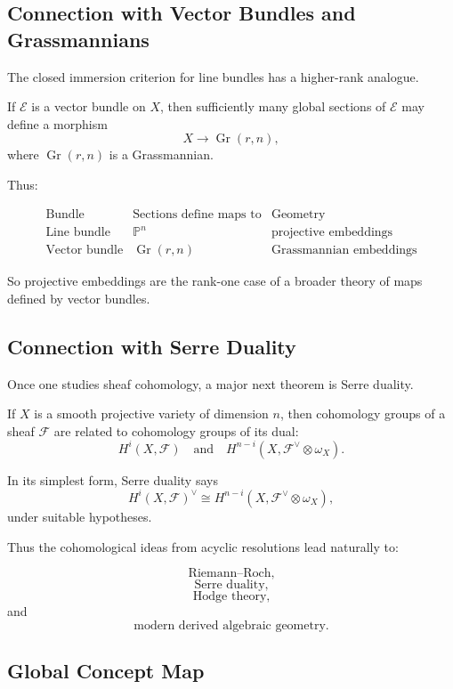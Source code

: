 \documentclass[12pt,a4paper]{article}
\theoremstyle{notespace}
\begin{document}
\subsection{Connection with Vector Bundles and Grassmannians}

The closed immersion criterion for line bundles has a higher-rank analogue.

If \(\mathcal E\) is a vector bundle on \(X\), then sufficiently many global sections of \(\mathcal E\) may define a morphism
\[
X\to \operatorname{Gr}(r,n),
\]
where \(\operatorname{Gr}(r,n)\) is a Grassmannian.

Thus:

\[
\begin{array}{c|c|c}
	\text{Bundle} & \text{Sections define maps to} & \text{Geometry} \\
	\hline
	\text{Line bundle} & \mathbb P^n & \text{projective embeddings} \\
	\text{Vector bundle} & \operatorname{Gr}(r,n) & \text{Grassmannian embeddings}
\end{array}
\]

So projective embeddings are the rank-one case of a broader theory of maps defined by vector bundles.

\subsection{Connection with Serre Duality}

Once one studies sheaf cohomology, a major next theorem is Serre duality.

If \(X\) is a smooth projective variety of dimension \(n\), then cohomology groups of a sheaf \(\mathcal F\) are related to cohomology groups of its dual:
\[
H^i(X,\mathcal F)
\quad\text{and}\quad
H^{n-i}(X,\mathcal F^\vee\otimes \omega_X).
\]

In its simplest form, Serre duality says
\[
H^i(X,\mathcal F)^\vee
\cong
H^{n-i}(X,\mathcal F^\vee\otimes \omega_X),
\]
under suitable hypotheses.

Thus the cohomological ideas from acyclic resolutions lead naturally to:

\[
\text{Riemann--Roch,}
\]
\[
\text{Serre duality,}
\]
\[
\text{Hodge theory,}
\]
and
\[
\text{modern derived algebraic geometry.}
\]

\subsection{Global Concept Map}
\end{document}
